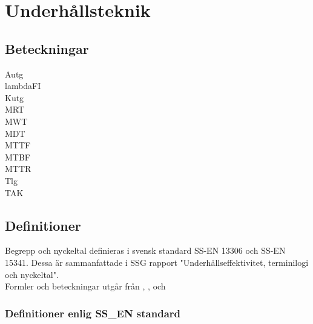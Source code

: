 \chapter{Underhållsteknik}
\section*{Beteckningar}
\acrfull{Autg}\\
\acrfull{lambdaFI}\\
\acrfull{Kutg}\\
\acrfull{MRT}\\
\acrfull{MWT}\\
\acrfull{MDT}\\
\acrfull{MTTF}\\
\acrfull{MTBF}\\
\acrfull{MTTR}\\
\acrfull{Tlg}\\
\acrfull{TAK}

	\section*{Definitioner}
	Begrepp och nyckeltal definieras i svensk standard SS-EN 13306 och SS-EN 15341. Dessa är sammanfattade i SSG rapport "Underhållseffektivitet, terminilogi och nyckeltal". \\
	Formler och beteckningar utgår från \cite{Hagberg2018uiv}, \cite{SS13460}, \cite{SS13306} och \cite{SS15341}

	\subsection*{Definitioner enlig SS\_EN standard}
	
